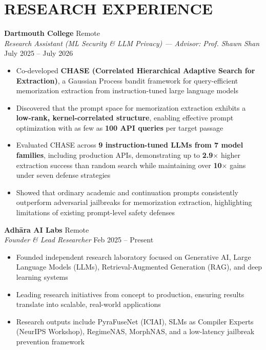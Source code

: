 \documentclass[a4paper,9pt]{extarticle}
\begin{document}
\section*{RESEARCH EXPERIENCE}

\noindent
\textbf{Dartmouth College} \hfill Remote\\
\textit{Research Assistant (ML Security \& LLM Privacy) — Advisor: Prof. Shawn Shan} \hfill July 2025 -- July 2026
\begin{itemize}
    \item Co-developed \textbf{CHASE (Correlated Hierarchical Adaptive Search for Extraction)}, a Gaussian Process bandit framework for query-efficient memorization extraction from instruction-tuned large language models
    \item Discovered that the prompt space for memorization extraction exhibits a \textbf{low-rank, kernel-correlated structure}, enabling effective prompt optimization with as few as \textbf{100 API queries} per target passage
    \item Evaluated CHASE across \textbf{9 instruction-tuned LLMs from 7 model families}, including production APIs, demonstrating up to \textbf{2.9$\times$} higher extraction success than random search while maintaining over \textbf{10$\times$} gains under seven defense strategies
    \item Showed that ordinary academic and continuation prompts consistently outperform adversarial jailbreaks for memorization extraction, highlighting limitations of existing prompt-level safety defenses
\end{itemize}

\noindent
\textbf{Adhāra AI Labs} \hfill Remote\\
\textit{Founder \& Lead Researcher} \hfill Feb 2025 -- Present
\begin{itemize}
    \item Founded independent research laboratory focused on Generative AI, Large Language Models (LLMs), Retrieval-Augmented Generation (RAG), and deep learning systems
    \item Leading research initiatives from concept to production, ensuring results translate into scalable, real-world applications
    \item Research outputs include PyraFuseNet (ICIAI), SLMs as Compiler Experts (NeurIPS Workshop), RegimeNAS, MorphNAS, and a low-latency jailbreak prevention framework
\end{itemize}
\end{document}

